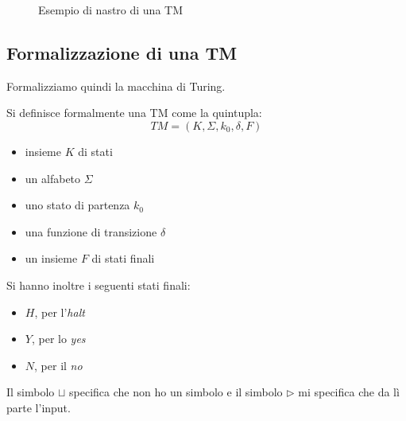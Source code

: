\begin{figure}
  \centering
  \caption{Esempio di nastro di una TM}
  \label{fig:tur}
\end{figure}
\subsection{Formalizzazione di una TM}
Formalizziamo quindi la macchina di Turing.
\begin{definizione}
  Si definisce formalmente una TM come la quintupla:
  \[TM=(K,\Sigma,k_0, \delta, F)\]
  \begin{itemize}
    \item insieme $K$ di stati
    \item un alfabeto $\Sigma$
    \item uno stato di partenza $k_0$
    \item una funzione di transizione $\delta$
    \item un insieme $F$ di stati finali
  \end{itemize}
  Si hanno inoltre i seguenti stati finali:
  \begin{itemize}
    \item $H$, per l'\textit{halt}
    \item $Y$, per lo \textit{yes}
    \item $N$, per il \textit{no}
  \end{itemize}
  Il simbolo $\sqcup$ specifica che non ho un simbolo e il simbolo
  $\triangleright$ mi specifica che da lì parte l'input.
\end{definizione}
